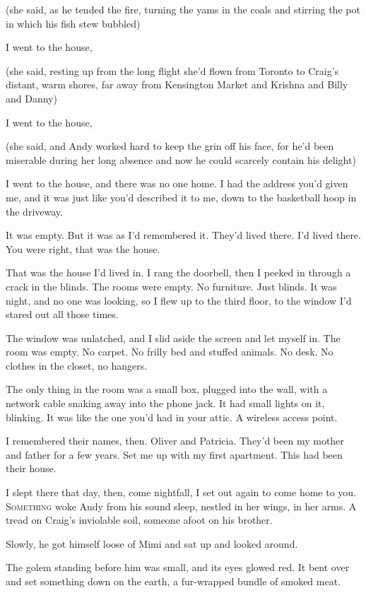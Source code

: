 \documentclass{article}
\begin{document}
(she said, as he tended the fire, turning the yams in the coals and
stirring the pot in which his fish stew bubbled)

I went to the house,

(she said, resting up from the long flight she'd flown from Toronto to
Craig's distant, warm shores, far away from Kensington Market and
Krishna and Billy and Danny)

I went to the house,

(she said, and Andy worked hard to keep the grin off his face, for
he'd been miserable during her long absence and now he could scarcely
contain his delight)

I went to the house, and there was no one home.  I had the address
you'd given me, and it was just like you'd described it to me, down to
the basketball hoop in the driveway.

It was empty.  But it was as I'd remembered it.  They'd lived there. 
I'd lived there.  You were right, that was the house.

That was the house I'd lived in.  I rang the doorbell, then I peeked
in through a crack in the blinds.  The rooms were empty.  No
furniture.  Just blinds.  It was night, and no one was looking, so I
flew up to the third floor, to the window I'd stared out all those
times.

The window was unlatched, and I slid aside the screen and let myself
in.  The room was empty.  No carpet.  No frilly bed and stuffed
animals.  No desk.  No clothes in the closet, no hangers.

The only thing in the room was a small box, plugged into the wall,
with a network cable snaking away into the phone jack.  It had small
lights on it, blinking.  It was like the one you'd had in your attic. 
A wireless access point.

I remembered their names, then.  Oliver and Patricia.  They'd been my
mother and father for a few years.  Set me up with my first apartment. 
This had been their house. 

I slept there that day, then, come nightfall, I set out again to come
home to you.
\\
\lettrine[lines=3, lhang=.5, nindent=0pt, findent=2pt]{S}{omething} woke Andy from his sound sleep, nestled in her wings, in her
arms.  A tread on Craig's inviolable soil, someone afoot on his
brother.

Slowly, he got himself loose of Mimi and sat up and looked around. 

The golem standing before him was small, and its eyes glowed red.  It
bent over and set something down on the earth, a fur-wrapped bundle of
smoked meat. 
\end{document}

